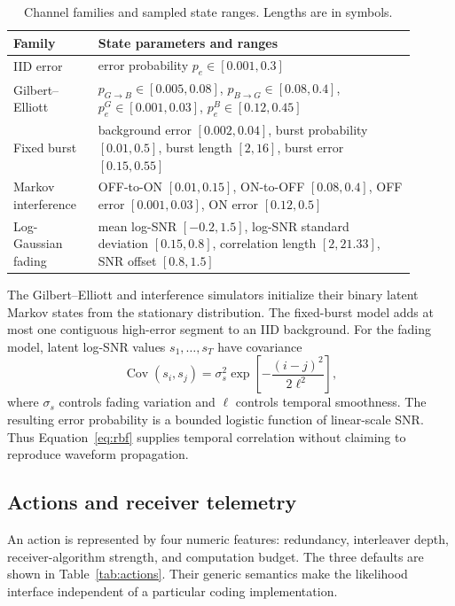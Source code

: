 \documentclass[10pt]{article}
\begin{document}
\begin{table}[t]
\centering
\small
\caption{Channel families and sampled state ranges. Lengths are in symbols.}
\label{tab:channels}
\begin{tabular}{p{0.19\linewidth}p{0.71\linewidth}}
\toprule
Family & State parameters and ranges \\
\midrule
IID error & error probability $p_e\in[0.001,0.3]$ \\
Gilbert--Elliott & $p_{G\to B}\in[0.005,0.08]$, $p_{B\to G}\in[0.08,0.4]$, $p_e^G\in[0.001,0.03]$, $p_e^B\in[0.12,0.45]$ \\
Fixed burst & background error $[0.002,0.04]$, burst probability $[0.01,0.5]$, burst length $[2,16]$, burst error $[0.15,0.55]$ \\
Markov interference & OFF-to-ON $[0.01,0.15]$, ON-to-OFF $[0.08,0.4]$, OFF error $[0.001,0.03]$, ON error $[0.12,0.5]$ \\
Log-Gaussian fading & mean log-SNR $[-0.2,1.5]$, log-SNR standard deviation $[0.15,0.8]$, correlation length $[2,21.33]$, SNR offset $[0.8,1.5]$ \\
\bottomrule
\end{tabular}
\end{table}

The Gilbert--Elliott and interference simulators initialize their binary latent Markov states from the stationary distribution. The fixed-burst model adds at most one contiguous high-error segment to an IID background. For the fading model, latent log-SNR values $s_1,\ldots,s_T$ have covariance
\begin{equation}
  \operatorname{Cov}(s_i,s_j)=\sigma_s^2
  \exp\!\left[-\frac{(i-j)^2}{2\ell^2}\right],
  \label{eq:rbf}
\end{equation}
where $\sigma_s$ controls fading variation and $\ell$ controls temporal smoothness. The resulting error probability is a bounded logistic function of linear-scale SNR. Thus Equation~\eqref{eq:rbf} supplies temporal correlation without claiming to reproduce waveform propagation.

\subsection{Actions and receiver telemetry}

An action is represented by four numeric features: redundancy, interleaver depth, receiver-algorithm strength, and computation budget. The three defaults are shown in Table~\ref{tab:actions}. Their generic semantics make the likelihood interface independent of a particular coding implementation.
\end{document}
